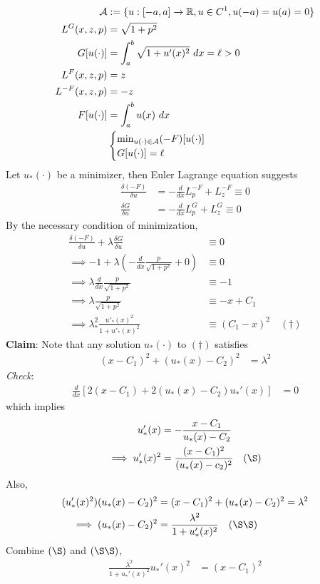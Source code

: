 \documentclass{article}
\begin{document}
	\begin{example}
		\begin{align}
			\mathcal{{A}} &:= \{
			u: [-a, a] \to \mathbb{R}, u \in C^1, u(-a) = u(a) = 0
			\} \\
			L^G(x, z, p) &= \sqrt{1 + p^2} \\
			G[u(\cdot)] &= \int_a^b \sqrt{1 + u'(x)^2}\ dx = \ell > 0 \\
			L^F(x, z, p) &= z \\
			L^{-F}(x, z, p) &= -z \\
			F[u(\cdot)] &= \int_a^b u(x)\ dx \\
			&\begin{cases}
				\min_{u(\cdot) \in \mathcal{{A}}} (-F)[u(\cdot)] \\
				G[u(\cdot)] = \ell
			\end{cases}
		\end{align}
		Let $u_*(\cdot)$ be a minimizer, then Euler Lagrange equation suggests 
		\begin{align}
			\frac{\delta (-F)}{\delta u} &= - \frac{d}{dx} L_p^{-F} + L_z^{-F} \equiv 0 \\
			\frac{\delta G}{\delta u} &= - \frac{d}{dx} L_p^G + L_z^G \equiv 0
		\end{align}
		By the necessary condition of minimization,
		\begin{align}
			\frac{\delta (-F)}{\delta u} + \lambda \frac{\delta G}{\delta u} &\equiv 0 \\
			\implies -1 + \lambda \left(
			- \frac{d}{dx} \frac{p}{\sqrt{1+p^2}} + 0 \right) &\equiv 0 \\
			\implies \lambda \frac{d}{dx} \frac{p}{\sqrt{1+p^2}} &\equiv -1 \\
			\implies \lambda \frac{p}{\sqrt{1+p^2}} &\equiv -x + C_1 \\
			\implies \lambda_*^2 \frac{u'_*(x)^2}{1 + u'_*(x)^2} &\equiv (C_1 - x)^2\quad  (\dagger)
		\end{align}
		\textbf{Claim}: Note that any solution $u_*(\cdot)$ to $(\dagger)$ satisfies
		\begin{align}
			(x-C_1)^2 + (u_*(x) - C_2)^2 &= \lambda^2
		\end{align}
		\emph{Check}: 
		\begin{align}
			\frac{d}{dx} \left[ 2(x - C_1) + 2(u_*(x) - C_2)u_*'(x) \right] &= 0
		\end{align}
		which implies
		\begin{align}
			u'_*(x) &= - \frac{x - C_1}{u_*(x) - C_2} \\
			\implies u'_*(x)^2 &= \frac{(x - C_1)^2}{(u_*(x) - c_2)^2}\quad (\S)
		\end{align}
		Also, 
		\begin{align}
			(u_*'(x)^2)(u_*(x) - C_2)^2  &= (x - C_1)^2 + (u_*(x) - C_2)^2 = \lambda^2 \\
			\implies (u_*(x) - C_2)^2 &= \frac{\lambda^2}{1 + u'_*(x)^2}\quad (\S \S)
		\end{align}
		Combine $(\S)$ and $(\S \S)$,
		\begin{align}
			\frac{\lambda^2}{1 + u_*'(x)^2} u_*'(x)^2 &= (x - C_1)^2
		\end{align}
	\end{example}
\end{document}
